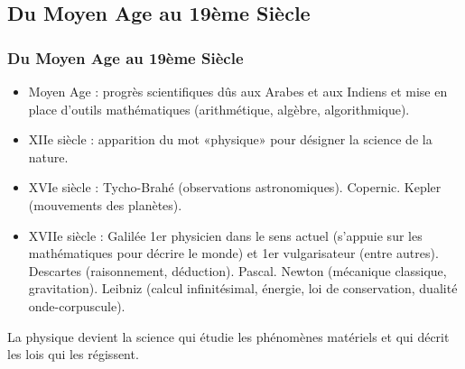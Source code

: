\subsection[Moyen Age-19ème]{Du Moyen Age au 19ème Siècle}
\begin{frame} \frametitle{Du Moyen Age au 19ème Siècle}
  \begin{itemize}
  \item Moyen Age : progrès scientifiques dûs aux Arabes et aux Indiens et mise en
    place d'outils mathématiques (arithmétique, algèbre, algorithmique).

  \item XIIe siècle : apparition du mot «physique» pour désigner la
    science de la nature.

  \item XVIe siècle : Tycho-Brahé (observations
    astronomiques). Copernic. Kepler (mouvements des planètes).


  \item XVIIe siècle : Galilée 1er physicien dans le sens actuel
    (s'appuie sur les mathématiques pour décrire le monde) et 1er
    vulgarisateur (entre autres). Descartes (raisonnement,
    déduction). Pascal. Newton (mécanique classique,
    gravitation). Leibniz (calcul infinitésimal, énergie, loi de
    conservation, dualité onde-corpuscule).



  \end{itemize}

\alert{La physique devient la science qui étudie les phénomènes
  matériels et qui décrit les lois qui les régissent.}

\end{frame}

